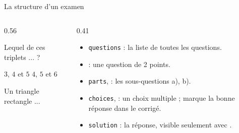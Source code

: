 \begin{frame}[fragile]{La structure d'un examen}
  \begin{columns}[T]
    \begin{column}{0.56\textwidth}
\begin{CodeTeX}[title={Le corps de 03-examen.tex (extrait)}]
\begin{questions}
\question[2] Lequel de ces triplets ... ?
\begin{choices}
  \CorrectChoice $3$, $4$ et $5$
  \choice $4$, $5$ et $6$
\end{choices}
\question Un triangle rectangle ...
\end{questions}
\end{CodeTeX}
    \end{column}
    \begin{column}{0.41\textwidth}
      \footnotesize
      \begin{itemize}
        \item \texttt{questions} : la liste de toutes les questions.
        \item {} : une question de 2 points.
        \item \texttt{parts},  : les sous-questions a), b).
        \item \texttt{choices},  : un choix multiple ;
           marque la bonne réponse dans le corrigé.
        \item \texttt{solution} : la réponse, visible seulement avec
          .
      \end{itemize}
    \end{column}
  \end{columns}
\end{frame}

